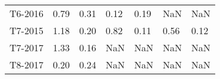\begin{tabular}{l C{2.5cm} C{2.5cm} C{2.5cm} C{2.5cm} C{2.5cm} C{2.5cm}}
     T6-2016 &                   0.79 &                0.31 &                   0.12 &                0.19 &                    NaN &                 NaN \tabularnewline
     T7-2015 &                   1.18 &                0.20 &                   0.82 &                0.11 &                   0.56 &                0.12 \tabularnewline
     T7-2017 &                   1.33 &                0.16 &                    NaN &                 NaN &                    NaN &                 NaN \tabularnewline
     T8-2017 &                   0.20 &                0.24 &                    NaN &                 NaN &                    NaN &                 NaN \tabularnewline
\bottomrule
\end{tabular}
